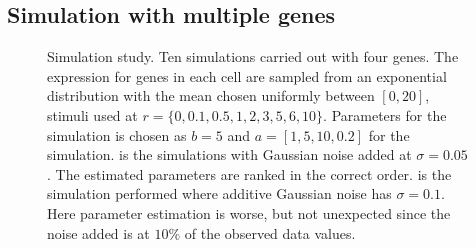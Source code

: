 \subsection{Simulation with multiple genes}
\label{sec:simul-with-mult}
\begin{figure}
  \centering
  \caption{Simulation study. Ten simulations carried out with four genes.  The expression for genes in each cell are sampled from an exponential distribution with the mean chosen uniformly between $[0, 20]$, stimuli used at $r =\lbrace 0, 0.1, 0.5, 1, 2, 3, 5, 6, 10 \rbrace$. Parameters for the simulation is chosen as $b=5$ and $a=[1, 5, 10, 0.2]$ for the simulation.  is the simulations with Gaussian noise added at $\sigma = 0.05$. The estimated parameters are ranked in the correct order.  is the simulation performed where additive Gaussian noise has $\sigma = 0.1$. Here parameter estimation is worse, but not unexpected since the noise added is at $10\%$ of the observed data values.}
  \label{fig:cc-4gn}
\end{figure}

